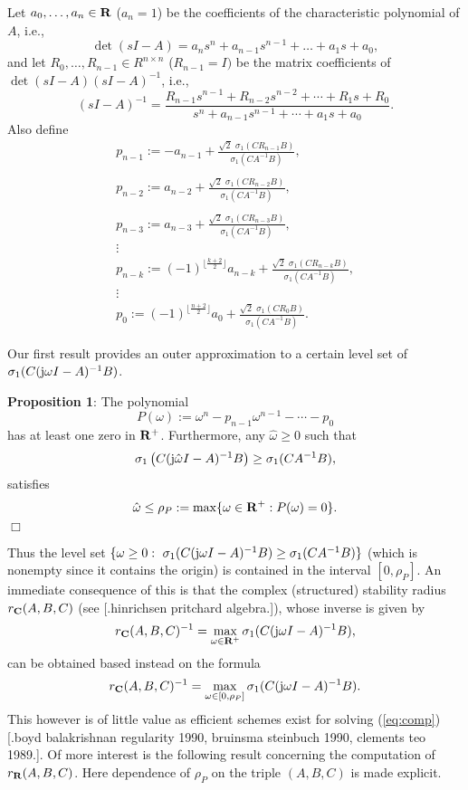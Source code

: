 \indent
Let $a_0, \ldots, a_n \in {\bf R}$ ($a_n=1$) be the coefficients 
of the characteristic polynomial of $A$, i.e., 
\[ \det (sI-A)=a_ns^n+a_{n-1}s^{n-1}+\ldots +a_1s+a_0,   \]
and let $R_0, \ldots, R_{n-1} \in R^{n \times n}$ ($R_{n-1}=I)$ be the 
matrix coefficients of $\det (sI-A)(sI-A)^{-1}$, i.e.,
\begin{equation}
(sI-A)^{-1}=\frac{R_{n-1}s^{n-1}+R_{n-2}s^{n-2}+\cdots+R_1s+R_0}
{s^n+a_{n-1}s^{n-1}+\cdots+a_1s+a_0}.
\label{eq:Fadee}
\end{equation}
Also define
\[ 
\begin{array}{l}
p_{n-1}:=-a_{n-1}+\frac{\sqrt{2} \,\,\sigma_1(CR_{n-1}B)}{\sigma_1(CA^{-1}B)},  \\
  \\
p_{n-2}:=a_{n-2}+\frac{\sqrt{2}\,\, \sigma_1(CR_{n-2}B)}{\sigma_1(CA^{-1}B)},  \\
  \\
p_{n-3}:=a_{n-3}+\frac{\sqrt{2}\,\, \sigma_1(CR_{n-3}B)}{\sigma_1(CA^{-1}B)},  \\
\vdots  \\
p_{n-k}:=(-1)^{\lfloor \frac{k+2}{2} \rfloor}a_{n-k}+
\frac{\sqrt{2}\,\, \sigma_1(CR_{n-k}B)}{\sigma_1(CA^{-1}B)},  \\
\vdots  \\
p_0:=
(-1)^{\lfloor \frac{n+2}{2} \rfloor}a_0+\frac{\sqrt{2}\,\, \sigma_1(CR_0B)}
{\sigma_1(CA^{-1}B)}.
\end{array}     \]

\bigskip
\noindent
Our first result provides an outer approximation to a certain level set of
$\sigma_1(C({\rm j} \omega I-A)^{-1}B)$.

\bigskip
\noindent
{\bf Proposition 1}: The polynomial 
\[  P(\omega):=\omega^n-p_{n-1}\omega^{n-1}-\cdots-p_0  \]
has at least one zero in ${\bf R}^+$. Furthermore, any 
$\hat{\omega} \geq 0$ such that
\begin{equation}
\sigma_1 \left( C({\rm j}\hat{\omega} I-A)^{-1}B \right) \geq \sigma_1
(CA^{-1}B),
\label{eq:cond}
\end{equation}
satisfies
\[ \hat{\omega} \leq \rho_P:=
\max \{ \omega \in {\bf R}^+: P(\omega)=0 \}.  \]
\hfill $\Box$

\bigskip
\noindent
Thus the level set $\{\omega \geq 0 : \ \sigma_1(C(\j\omega I-A)^{-1}B) 
\geq \sigma_1(CA^{-1}B) \}$ (which is nonempty since it contains the origin) is 
contained in the interval $[0, \rho_P]$. An immediate consequence of this is 
that the complex (structured) stability radius $r_{\bf C}(A,B,C)$ (see [.hinrichsen 
pritchard algebra.]), whose inverse is given by
\begin{equation}
r_{\bf C}(A,B,C)^{-1}=\max_{\omega \in {\bf R}^+} \sigma_1(C({\rm j} \omega I-A)^{-1}B),
\label{eq:comp}
\end{equation}
can be obtained based instead on the formula
\[ r_{\bf C}(A,B,C)^{-1}=\max_{\omega \in [0, \rho_P]} \sigma_1(C({\rm j} \omega I-A)^{-1}B)
.\]
This however is of little value as efficient schemes exist for solving 
(\ref{eq:comp}) [.boyd balakrishnan regularity 1990, bruinsma steinbuch 1990,
clements teo 1989.]. Of more interest is the following 
result concerning the computation of $r_{\bf R}(A,B,C)$. Here dependence 
of $\rho_P$ on the triple $(A,B,C)$ is made explicit.

